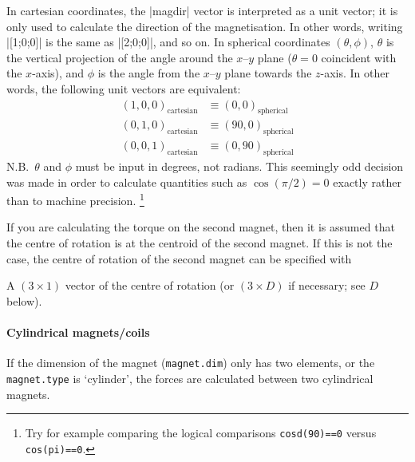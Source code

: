\documentclass{article}
\begin{document}
In cartesian coordinates, the |magdir| vector is interpreted as a unit vector; it is only used to calculate the direction of the magnetisation.
In other words, writing |[1;0;0]| is the same as |[2;0;0]|, and so on.
In spherical coordinates $(\theta,\phi)$, $\theta$ is the vertical projection of the angle around the $x$--$y$ plane ($\theta=0$ coincident with the $x$-axis), and $\phi$ is the angle from the $x$--$y$ plane towards the $z$-axis.
In other words, the following unit vectors are equivalent:
\begin{align*}
(1,0,0)_{\text{cartesian}} &\equiv (0,0)_{\text{spherical}}\\
(0,1,0)_{\text{cartesian}} &\equiv (90,0)_{\text{spherical}}\\
(0,0,1)_{\text{cartesian}} &\equiv (0,90)_{\text{spherical}}
\end{align*}
N.B.\ $\theta$ and $\phi$ must be input in degrees, not radians.
This seemingly odd decision was made in order to calculate quantities such as $\cos(\pi/2)=0$ exactly rather than to machine precision.%
\footnote{Try for example comparing the logical comparisons \texttt{cosd(90)==0} versus \texttt{cos(pi)==0}.}

If you are calculating the torque on the second magnet, then it is assumed that the centre of rotation is at the centroid of the second magnet.
If this is not the case, the centre of rotation of the second magnet can be specified with
\begin{description}[noitemsep,font=\ttfamily]
\item[magnet_float.lever] A $(3\times1)$ vector of the centre of rotation
(or $(3\times D)$ if necessary; see $D$ below).
\end{description}

\paragraph{Cylindrical magnets/coils}
If the dimension of the magnet (\texttt{magnet.dim}) only has two elements,
or the \texttt{magnet.type} is `\textsf{cylinder}', the forces are calculated between two cylindrical magnets.
\end{document}
